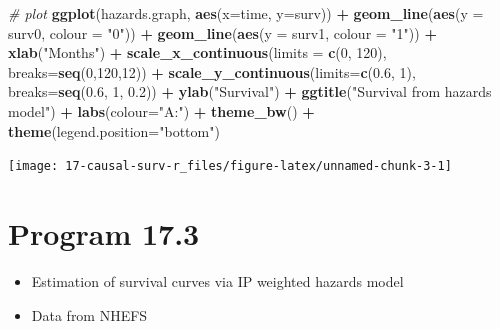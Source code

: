 \documentclass[
  10pt,
]{book}
\newenvironment{Shaded}{\begin{snugshade}}{\end{snugshade}}
\newcommand{\CommentTok}[1]{\textcolor[rgb]{0.56,0.35,0.01}{\textit{#1}}}
\newcommand{\DataTypeTok}[1]{\textcolor[rgb]{0.13,0.29,0.53}{#1}}
\newcommand{\DecValTok}[1]{\textcolor[rgb]{0.00,0.00,0.81}{#1}}
\newcommand{\FloatTok}[1]{\textcolor[rgb]{0.00,0.00,0.81}{#1}}
\newcommand{\KeywordTok}[1]{\textcolor[rgb]{0.13,0.29,0.53}{\textbf{#1}}}
\newcommand{\NormalTok}[1]{#1}
\newcommand{\OperatorTok}[1]{\textcolor[rgb]{0.81,0.36,0.00}{\textbf{#1}}}
\newcommand{\StringTok}[1]{\textcolor[rgb]{0.31,0.60,0.02}{#1}}
\providecommand{\tightlist}{%
  \setlength{\itemsep}{0pt}\setlength{\parskip}{0pt}}
\begin{document}
\begin{Shaded}
\begin{Highlighting}[]
\CommentTok{\# plot}
\KeywordTok{ggplot}\NormalTok{(hazards.graph, }\KeywordTok{aes}\NormalTok{(}\DataTypeTok{x=}\NormalTok{time, }\DataTypeTok{y=}\NormalTok{surv)) }\OperatorTok{+}\StringTok{ }
\StringTok{  }\KeywordTok{geom\_line}\NormalTok{(}\KeywordTok{aes}\NormalTok{(}\DataTypeTok{y =}\NormalTok{ surv0, }\DataTypeTok{colour =} \StringTok{"0"}\NormalTok{)) }\OperatorTok{+}\StringTok{ }
\StringTok{  }\KeywordTok{geom\_line}\NormalTok{(}\KeywordTok{aes}\NormalTok{(}\DataTypeTok{y =}\NormalTok{ surv1, }\DataTypeTok{colour =} \StringTok{"1"}\NormalTok{)) }\OperatorTok{+}\StringTok{ }
\StringTok{  }\KeywordTok{xlab}\NormalTok{(}\StringTok{"Months"}\NormalTok{) }\OperatorTok{+}\StringTok{ }
\StringTok{  }\KeywordTok{scale\_x\_continuous}\NormalTok{(}\DataTypeTok{limits =} \KeywordTok{c}\NormalTok{(}\DecValTok{0}\NormalTok{, }\DecValTok{120}\NormalTok{), }\DataTypeTok{breaks=}\KeywordTok{seq}\NormalTok{(}\DecValTok{0}\NormalTok{,}\DecValTok{120}\NormalTok{,}\DecValTok{12}\NormalTok{)) }\OperatorTok{+}
\StringTok{  }\KeywordTok{scale\_y\_continuous}\NormalTok{(}\DataTypeTok{limits=}\KeywordTok{c}\NormalTok{(}\FloatTok{0.6}\NormalTok{, }\DecValTok{1}\NormalTok{), }\DataTypeTok{breaks=}\KeywordTok{seq}\NormalTok{(}\FloatTok{0.6}\NormalTok{, }\DecValTok{1}\NormalTok{, }\FloatTok{0.2}\NormalTok{)) }\OperatorTok{+}
\StringTok{  }\KeywordTok{ylab}\NormalTok{(}\StringTok{"Survival"}\NormalTok{) }\OperatorTok{+}\StringTok{ }
\StringTok{  }\KeywordTok{ggtitle}\NormalTok{(}\StringTok{"Survival from hazards model"}\NormalTok{) }\OperatorTok{+}\StringTok{ }
\StringTok{  }\KeywordTok{labs}\NormalTok{(}\DataTypeTok{colour=}\StringTok{"A:"}\NormalTok{) }\OperatorTok{+}
\StringTok{  }\KeywordTok{theme\_bw}\NormalTok{() }\OperatorTok{+}\StringTok{ }
\StringTok{  }\KeywordTok{theme}\NormalTok{(}\DataTypeTok{legend.position=}\StringTok{"bottom"}\NormalTok{)}
\end{Highlighting}
\end{Shaded}

\begin{center}\texttt{[image: 17-causal-surv-r\_files/figure-latex/unnamed-chunk-3-1]} \end{center}

\hypertarget{program-17.3}{%
\section{Program 17.3}\label{program-17.3}}

\begin{itemize}
\tightlist
\item
  Estimation of survival curves via IP weighted hazards model
\item
  Data from NHEFS
\end{itemize}
\end{document}
